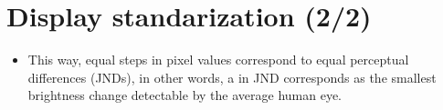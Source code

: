 \section*{Display standarization (2/2)}
\begin{itemize}
\item This way, equal steps in pixel values correspond to equal
  perceptual differences (\glspl{JND}), in other words, a
   in
  \gls{JND} corresponds as the smallest brightness change detectable
  by the average human eye.
\end{itemize}
